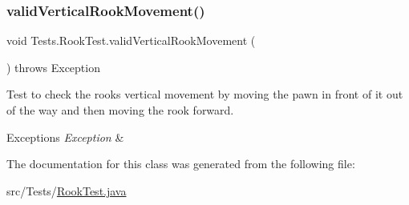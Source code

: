 \subsubsection{\texorpdfstring{valid\+Vertical\+Rook\+Movement()}{validVerticalRookMovement()}}
{\footnotesize\ttfamily void Tests.\+Rook\+Test.\+valid\+Vertical\+Rook\+Movement (\begin{DoxyParamCaption}{ }\end{DoxyParamCaption}) throws Exception}

Test to check the rook\textquotesingle{}s vertical movement by moving the pawn in front of it out of the way and then moving the rook forward. 
\begin{DoxyExceptions}{Exceptions}
{\em Exception} & \\
\hline
\end{DoxyExceptions}


The documentation for this class was generated from the following file\+:\begin{DoxyCompactItemize}
\item 
src/\+Tests/\hyperlink{_rook_test_8java}{Rook\+Test.\+java}\end{DoxyCompactItemize}
